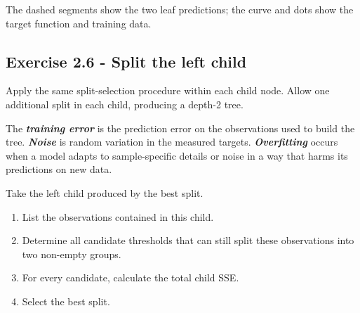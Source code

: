 \documentclass[10pt]{article}
\begin{document}
\begin{center}\end{center}
The dashed segments show the two leaf predictions; the curve and dots show the target function and training data.
\begin{center}
\end{center}
\par\endgroup

\subsection*{Exercise 2.6 - Split the left child}
Apply the same split-selection procedure within each child node. Allow one additional split in each child, producing a depth-2 tree.

The \textbf{\textit{training error}} is the prediction error on the observations used to build the tree. \textbf{\textit{Noise}} is random variation in the measured targets. \textbf{\textit{Overfitting}} occurs when a model adapts to sample-specific details or noise in a way that harms its predictions on new data.

Take the left child produced by the best split.

\begin{enumerate}
\item
List the observations contained in this child.

\item
Determine all candidate thresholds that can still split these observations into two non-empty groups.

\item
For every candidate, calculate the total child SSE.

\item
Select the best split.

\end{enumerate}
\begingroup\color{red}
\end{document}
